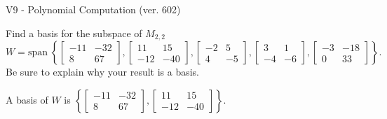 \begin{exercise}
  \begin{exerciseTitle}V9 - Polynomial Computation (ver. 602)\end{exerciseTitle}
  \begin{exerciseStatement}
    Find a basis for the subspace of \(M_{2,2}\) 
\[W=\mathrm{span}\ \left\{\left[\begin{array}{cc}
-11 & -32 \\
8 & 67
\end{array}\right] , \left[\begin{array}{cc}
11 & 15 \\
-12 & -40
\end{array}\right] , \left[\begin{array}{cc}
-2 & 5 \\
4 & -5
\end{array}\right] , \left[\begin{array}{cc}
3 & 1 \\
-4 & -6
\end{array}\right] , \left[\begin{array}{cc}
-3 & -18 \\
0 & 33
\end{array}\right]\right\}.\]
 Be sure to explain why your result is a basis.


  \end{exerciseStatement}
  \begin{exerciseAnswer}
   A basis of \(W\) is  \(\left\{\left[\begin{array}{cc}
-11 & -32 \\
8 & 67
\end{array}\right] , \left[\begin{array}{cc}
11 & 15 \\
-12 & -40
\end{array}\right]\right\}\).
  


  \end{exerciseAnswer}
\end{exercise}